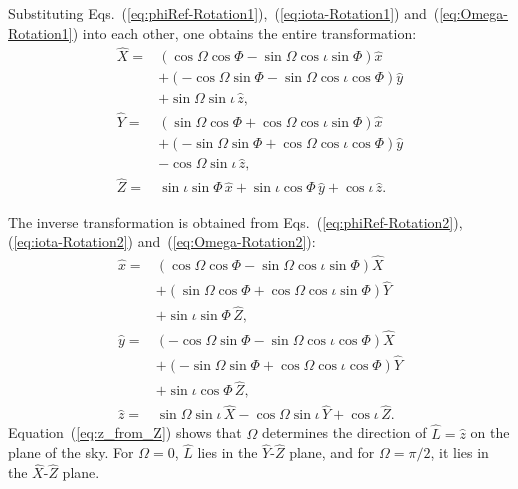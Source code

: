 \documentclass[aps,prd,amssymb,amsmath,amsfonts,superscriptaddress,
floatfix ,preprintnumbers,altaffilletter]{revtex4}
\newcommand{\lNR}{\hat L}
\newcommand{\ExS}{{{\hat x}}}
\newcommand{\EyS}{{{\hat y}}}
\newcommand{\EzS}{{{\hat z}}}
\newcommand{\ExW}{\hat X}
\newcommand{\EyW}{\hat Y}
\newcommand{\EzW}{\hat Z}
\newcommand{\phiRef}{\Phi} %
\begin{document}
Substituting Eqs.~(\ref{eq:phiRef-Rotation1}),~(\ref{eq:iota-Rotation1}) and~(\ref{eq:Omega-Rotation1}) into each other, one obtains the entire transformation:
\begin{subequations}
  \label{eq:Source-To-Wave}
  \begin{align}
    \ExW=& \left(\cos\Omega\cos\phiRef-\sin\Omega\cos\iota\sin\phiRef\right)\ExS
    \nonumber \\
    & + \left(-\cos\Omega\sin\phiRef-\sin\Omega\cos\iota\cos\phiRef\right)\EyS
    \nonumber\\
    & + \sin\Omega\sin\iota\,\EzS,\\
\EyW=& \left(\sin\Omega\cos\phiRef+\cos\Omega\cos\iota\sin\phiRef\right)\ExS
    \nonumber \\
    & + \left(-\sin\Omega\sin\phiRef+\cos\Omega\cos\iota\cos\phiRef\right)\EyS
    \nonumber\\
    & - \cos\Omega\sin\iota\,\EzS,\\
\label{eq:Z_from_z}
\EzW=&\sin\iota\sin\phiRef\,\ExS+\sin\iota\cos\phiRef\,\EyS + \cos\iota\,\EzS.
  \end{align}
  \end{subequations}


The inverse transformation is obtained from
Eqs.~(\ref{eq:phiRef-Rotation2}), (\ref{eq:iota-Rotation2})
and~(\ref{eq:Omega-Rotation2}):
\begin{subequations}
  \label{eq:Wave-To-Source}
  \begin{align}
    \ExS=& \left(\cos\Omega\cos\phiRef-\sin\Omega\cos\iota\sin\phiRef\right)\ExW
    \nonumber \\
    & + \left(\sin\Omega\cos\phiRef+\cos\Omega\cos\iota\sin\phiRef\right)\EyW
    \nonumber\\
    & + \sin\iota\sin\phiRef\,\EzW,\\
\EyS=& \left(-\cos\Omega\sin\phiRef-\sin\Omega\cos\iota\cos\phiRef\right)\ExW
    \nonumber \\
    & + \left(-\sin\Omega\sin\phiRef+\cos\Omega\cos\iota\cos\phiRef\right)\EyW
    \nonumber\\
    & + \sin\iota\cos\phiRef\,\EzW,\\
\label{eq:z_from_Z}
    \EzS=&\sin\Omega\sin\iota\,\ExW-\cos\Omega\sin\iota\,\EyW + \cos\iota\,\EzW.
  \end{align}
  \end{subequations}
Equation~(\ref{eq:z_from_Z}) shows that $\Omega$ determines the
direction of $\lNR=\hat z$ on the plane of the sky.  For $\Omega=0$,
$\lNR$ lies in the $\EyW$-$\EzW$ plane, and for $\Omega=\pi/2$, it lies
in the $\ExW$-$\EzW$ plane.
\end{document}
